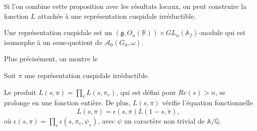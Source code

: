 Si l'on combine cette proposition avec les résultats locaux, on peut construire la fonction $L$ attachée à une représentation cuspidale irréductible.
\begin{definition}
Une représentation cuspidale est un $(\mathfrak{g}, O_n(\mathbb{R})) \times GL_n(\mathbb{A}_f)$-module qui est isomorphe à un sous-quotient de $\mathcal{A}_0(G_\mathbb{A}, \omega)$.
\end{definition}

Plus précisément, on montre le
\begin{theoreme}
Soit $\pi$ une représentation cuspidale irréductible.

Le produit $L(s, \pi) = \prod_v L(s, \pi_v)$, qui est défini pour $Re(s) > n$, se prolonge en une fonction entière. De plus, $L(s, \pi)$ vérifie l'équation fonctionnelle
\begin{equation}
L(s,\pi) = \epsilon(s,\pi)L(1-s,\tilde{\pi}),
\end{equation}
où $\epsilon(s,\pi) = \prod_v \epsilon(s, \pi_v, \psi_v)$, avec $\psi$ un caractère non trivial de $\mathbb{A}/\mathbb{Q}$.
\end{theoreme}

